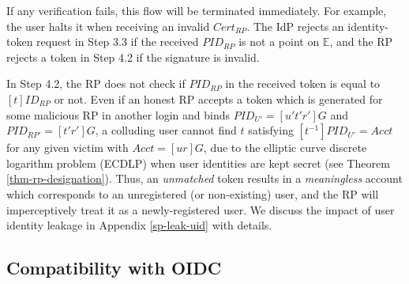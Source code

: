 If any verification fails, this flow will be terminated immediately.
For example, the user halts it when receiving an invalid $Cert_{RP}$.
The IdP rejects an identity-token request in Step 3.3 if the received $PID_{RP}$ is not a point on $\mathbb{E}$, and the RP rejects a token in Step 4.2 if the signature is invalid. 

In Step 4.2, the RP does not check if $PID_{RP}$ in the received token is equal to $[t]{ID_{RP}}$ or not.
Even if an honest RP accepts a token which is generated for some malicious RP in another login and binds $PID_{U'} = [u't'r']G$ and $PID_{RP'}=[t'r']G$,
 a colluding user cannot find $t$ satisfying $[t^{-1}]PID_{U'} = Acct$ for any given victim with $Acct = [ur]G$,
 due to the elliptic curve discrete logarithm problem (ECDLP) when user identities are kept secret (see Theorem \ref{thm-rp-designation}).
Thus, an \emph{unmatched} token results in a \emph{meaningless} account which corresponds to an unregistered (or non-existing) user, and the RP will imperceptively treat it as a newly-registered user.
We discuss the impact of user identity leakage in Appendix \ref{sp-leak-uid} with details.

%

\subsection{Compatibility with OIDC}
\label{subsec:compatible}

